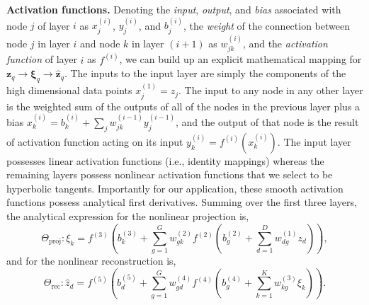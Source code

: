 \documentclass[12pt]{article}
\newcommand{\p}[1]{\left(#1\right)}
\begin{document}
\textbf{Activation functions.} Denoting the \textit{input}, \textit{output}, and \textit{bias} associated with node $j$ of layer $i$ as $x_j^{(i)}$, $y_j^{(i)}$, and $b_j^{(i)}$, the \textit{weight} of the connection between node $j$ in layer $i$ and node $k$ in layer $(i+1)$ as $w_{jk}^{(i)}$, and the \textit{activation function} of layer $i$ as $f^{(i)}$, we can build up an explicit mathematical mapping for $\mathbf{z}_q \rightarrow \boldsymbol\xi_q \rightarrow \hat{\mathbf{z}}_q$. The inputs to the input layer are simply the components of the high dimensional data points $x_j^{(1)} = z_j$. The input to any node in any other layer is the weighted sum of the outputs of all of the nodes in the previous layer plus a bias $x_k^{(i)} = b_k^{(i)} + \sum_j w_{jk}^{(i-1)} y_j^{(i-1)}$, and the output of that node is the result of activation function acting on its input $y_k^{(i)} = f^{(i)}\left( x_k^{(i)} \right)$. The input layer possesses linear activation functions (i.e., identity mappings) whereas the remaining layers possess nonlinear activation functions that we select to be hyperbolic tangents\cite{friedman2001elements}. Importantly for our application, these smooth activation functions possess analytical first derivatives. Summing over the first three layers, the analytical expression for the nonlinear projection is,
\begin{equation}\label{proj}
\Theta_\mathrm{proj} : \xi_k = f^{(3)} \left( b_k^{(3)} + \sum_{g=1}^G w_{gk}^{(2)} f^{(2)} \left( b_g^{(2)} + \sum_{d=1}^D w_{dg}^{(1)} z_d \right) \right),
\end{equation}
and for the nonlinear reconstruction is,
\begin{equation}\label{rec}
\Theta_\mathrm{rec} : \hat{z}_d = f^{(5)}\p{b_d^{(5)} + \sum_{g=1}^G w_{gd}^{(4)} f^{(4)} \left( b_g^{(4)} + \sum_{k=1}^K w_{kg}^{(3)} \xi_k \right)}.
\end{equation}
\end{document}
